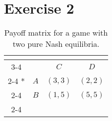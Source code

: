 \documentclass{article}
\begin{document}
\section*{Exercise 2}

\begin{table}[H]
\centering
  \setlength{\extrarowheight}{2pt}
  \begin{tabular}{*{4}{c|}}
    \multicolumn{2}{c}{} & \multicolumn{2}{c}{}\\\cline{3-4}
    \multicolumn{1}{c}{} &  & $C$  & $D$ \\\cline{2-4}
    \multirow{2}*{}  & $A$ & $(3,3)$ & $(2,2)$ \\\cline{2-4}
    & $B$ & $(1,5)$ & $(5,5)$ \\\cline{2-4}
  \end{tabular}
\caption{Payoff matrix for a game with two pure Nash equilibria.}
\label{table:ex2payoff}
\end{table}
\end{document}

